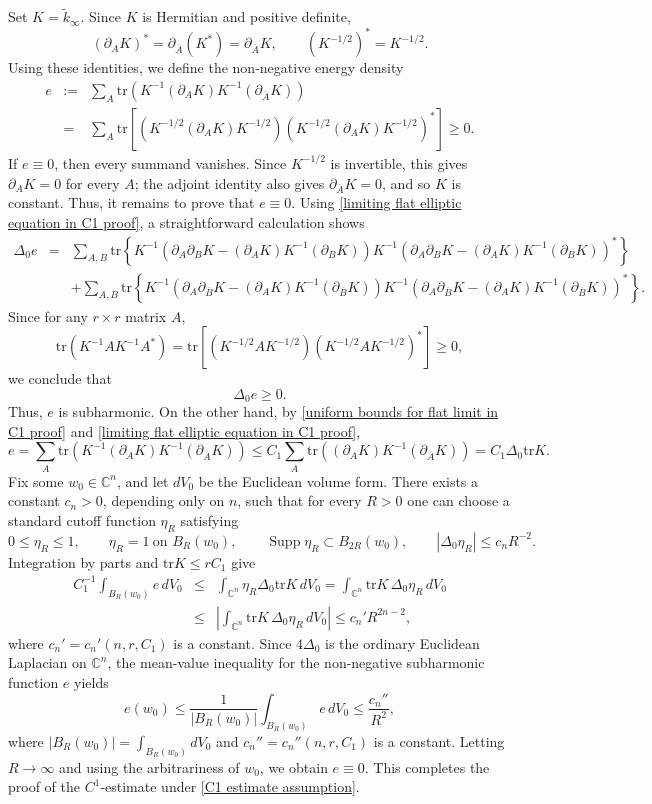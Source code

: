 \documentclass[12pt, reqno]{amsart}
\DeclareMathOperator*{\supp}{Supp}
\theoremstyle{plain}
\theoremstyle{definition}
\newcommand{\p}{\partial}
\renewcommand{\bar}{\overline}
\newcommand{\beq}{\begin{equation}}
\newcommand{\eeq}{\end{equation}}
\newcommand{\ee}{\end{eqnarray*}}
\newcommand{\be}{\begin{eqnarray*}}
\renewcommand{\tilde}{\widetilde}
\renewcommand{\>}{\rightarrow}
\newcommand{\C}{{\mathbb C}}
\renewcommand{\>}{\rightarrow}
\renewcommand{\p}{{\partial}}
\renewcommand{\bar}{\overline}
\renewcommand{\tilde}{\widetilde}
\newcommand{\tr}{\mathrm{tr}}
\numberwithin{equation}{section} %
\begin{document}
Set $K=\tilde k_\infty$. Since $K$ is Hermitian and positive definite,
\[
(\p_AK)^*=\p_{\bar A}(K^*)=\p_{\bar A}K,
\qquad
(K^{-1/2})^*=K^{-1/2}.
\]
Using these identities, we define the non-negative energy density
\begin{eqnarray}
e
&:=&\sum_A\tr\left(
K^{-1}(\p_AK)K^{-1}(\p_{\bar A}K)
\right)\nonumber\\
&=&\sum_A\tr\left[
\left(K^{-1/2}(\p_AK)K^{-1/2}\right)
\left(K^{-1/2}(\p_AK)K^{-1/2}\right)^*
\right]\geq0.
\end{eqnarray}
If $e\equiv0$, then every summand vanishes. Since $K^{-1/2}$ is invertible, this gives $\p_AK=0$ for every $A$; the adjoint identity also gives $\p_{\bar A}K=0$, and so $K$ is constant. Thus, it remains to prove that $e\equiv0$.
Using \eqref{limiting flat elliptic equation in C1 proof}, a straightforward calculation shows
\be
\Delta_0e
&=&\sum_{A,B}\tr\left\{
K^{-1}\left(\p_A\p_BK-(\p_AK)K^{-1}(\p_BK)\right)
K^{-1}\left(\p_A\p_BK-(\p_AK)K^{-1}(\p_BK)\right)^*
\right\}\\
&&+\sum_{A,B}\tr\left\{
K^{-1}\left(\p_A\p_{\bar B}K-(\p_AK)K^{-1}(\p_{\bar B}K)\right)
K^{-1}\left(\p_A\p_{\bar B}K-(\p_AK)K^{-1}(\p_{\bar B}K)\right)^*
\right\}.
\ee
Since for any $r\times r$ matrix $A$,
\[
    \tr\left(K^{-1}AK^{-1}A^*\right)
    = \tr\left[\left(K^{-1/2}AK^{-1/2}\right)\left(K^{-1/2}AK^{-1/2}\right)^*\right]\geq 0,
\]
we conclude that 
\beq
    \Delta_0 e\geq 0.
\eeq 
Thus, $e$ is subharmonic. On the other hand, by \eqref{uniform bounds for flat limit in C1 proof} and \eqref{limiting flat elliptic equation in C1 proof},
\beq
e
=\sum_A\tr\left(
K^{-1}(\p_AK)K^{-1}(\p_{\bar A}K)
\right)
\leq C_1\sum_A\tr\left(
(\p_AK)K^{-1}(\p_{\bar A}K)
\right)
=C_1\Delta_0\tr K.
\eeq
Fix some $w_0\in\C^n$, and let $dV_0$ be the Euclidean volume form. There exists a constant $c_n>0$, depending only on $n$, such that for every $R>0$ one can choose a standard cutoff function $\eta_R$ satisfying
\beq
0\leq\eta_R\leq1,\qquad
\eta_R=1\ \text{on }B_R(w_0),\qquad
\supp\eta_R\subset B_{2R}(w_0),
\qquad
|\Delta_0\eta_R|\leq c_nR^{-2}.
\eeq
Integration by parts and $\tr K\leq rC_1$ give
\begin{eqnarray}
C_1^{-1}\int_{B_R(w_0)}e\,dV_0
&\leq&
\int_{\C^n}\eta_R\Delta_0\tr K\,dV_0
=\int_{\C^n}\tr K\,\Delta_0\eta_R\,dV_0\nonumber\\
&\leq&
\left|\int_{\C^n}\tr K\,\Delta_0\eta_R\,dV_0\right|
\leq c_n'R^{2n-2},
\end{eqnarray}
where $c_n'=c_n'(n,r,C_1)$ is a constant.
Since $4\Delta_0$ is the ordinary Euclidean Laplacian on $\C^n$, the mean-value inequality for the non-negative subharmonic function $e$ yields
\beq
e(w_0)
\leq
\frac{1}{|B_R(w_0)|}
\int_{B_R(w_0)}e\,dV_0
\leq \frac{c_n''}{R^2},
\eeq
where $|B_R(w_0)|=\int_{B_R(w_0)}dV_0$ and $c_n''=c_n''(n,r,C_1)$ is a constant.
Letting $R\to\infty$ and using the arbitrariness of $w_0$, we obtain $e\equiv0$. This completes the proof of the $C^1$-estimate under \eqref{C1 estimate assumption}.
\end{document}
